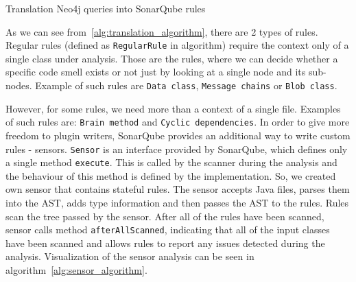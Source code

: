 \begin{algorithm} [!htb]
    \caption{Translation Neo4j queries into SonarQube rules}
    \label{alg:translation_algorithm}
    \BlankLine

\end{algorithm}

As we can see from~\ref{alg:translation_algorithm}, there are 2 types of rules.
Regular rules (defined as \verb|RegularRule| in algorithm) require the context only of a single class under analysis.
Those are the rules, where we can decide whether a specific code smell exists or not just by looking at a single node
and its sub-nodes.
Example of such rules are \verb|Data class|, \verb|Message chains| or \verb|Blob class|.

However, for some rules, we need more than a context of a single file.
Examples of such rules are: \verb|Brain method| and \verb|Cyclic dependencies|.
In order to give more freedom to plugin writers, SonarQube provides an additional way to write custom rules - sensors.
\verb|Sensor| is an interface provided by SonarQube, which defines only a single method \verb|execute|.
This is called by the scanner during the analysis and the behaviour of this method is defined by the implementation.
So, we created own sensor that contains stateful rules.
The sensor accepts Java files, parses them into the AST, adds type information and then passes the AST to the rules.
Rules scan the tree passed by the sensor.
After all of the rules have been scanned, sensor calls method \verb|afterAllScanned|, indicating that all of the
input classes have been scanned and allows rules to report any issues detected during the analysis.
Visualization of the sensor analysis can be seen in algorithm~\ref{alg:sensor_algorithm}.

